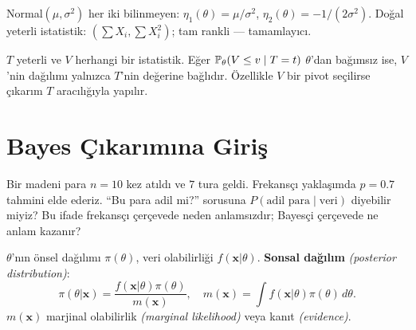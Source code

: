 \begin{ornek}\label{ex:cift_param_ustel}
Normal$(\mu,\sigma^2)$ her iki bilinmeyen: $\eta_1(\theta)=\mu/\sigma^2$, $\eta_2(\theta)=-1/(2\sigma^2)$. Doğal yeterli istatistik: $(\sum X_i, \sum X_i^2)$; tam rankli --- tamamlayıcı.
\end{ornek}

\begin{teorem}\label{thm:yeterli_bagimsizlik}
$T$ yeterli ve $V$ herhangi bir istatistik. Eğer $\mathbb{P}_\theta(V\leq v\mid T=t)$ $\theta$'dan bağımsız ise, $V$'nin dağılımı yalnızca $T$'nin değerine bağlıdır. Özellikle $V$ bir pivot seçilirse çıkarım $T$ aracılığıyla yapılır.
\end{teorem}

\section{Bayes Çıkarımına Giriş}
\label{sec:bayes_giris}

\begin{kesif}
Bir madeni para $n = 10$ kez atıldı ve $7$ tura geldi. Frekansçı yaklaşımda
$\hat{p} = 0.7$ tahmini elde ederiz. ``Bu para adil mi?'' sorusuna
$P(\text{adil para} \mid \text{veri})$ diyebilir miyiz?
Bu ifade frekansçı çerçevede neden anlamsızdır; Bayesçi çerçevede ne anlam kazanır?
\end{kesif}

\begin{tanim}\label{def:bayes_istatistik}
$\theta$'nın önsel dağılımı $\pi(\theta)$, veri olabilirliği $f(\mathbf{x}|\theta)$. \textbf{Sonsal dağılım} \emph{(posterior distribution)}:
\[
  \pi(\theta|\mathbf{x}) = \frac{f(\mathbf{x}|\theta)\pi(\theta)}{m(\mathbf{x})}, \quad m(\mathbf{x}) = \int f(\mathbf{x}|\theta)\pi(\theta)\,d\theta.
\]
$m(\mathbf{x})$ marjinal olabilirlik \emph{(marginal likelihood)} veya kanıt \emph{(evidence)}.
\end{tanim}

